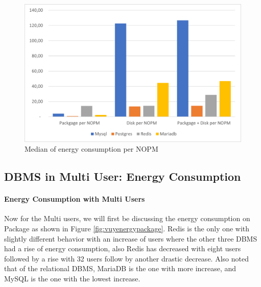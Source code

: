 \begin{figure}[H]
\centering
    \includegraphics[width=0.8\columnwidth]{results/median/energy-nopm.png}
\caption{Median of energy consumption per NOPM}
\label{fig:mediannopmenergy}\end{figure}








\subsection{DBMS in Multi User: Energy Consumption}






\paragraph{Energy Consumption with Multi Users}


    Now for the Multi users, we will first be discussing the energy consumption on Package as shown in Figure \ref{fig:vuyenergypackage}.  Redis is the only one with slightly different behavior with an increase of users where the other three DBMS had a rise of energy consumption, also Redis has decreased with eight users followed by a rise with 32 users follow by another drastic decrease. Also noted that of the relational DBMS, MariaDB is the one with more increase, and MySQL is the one with the lowest increase.

